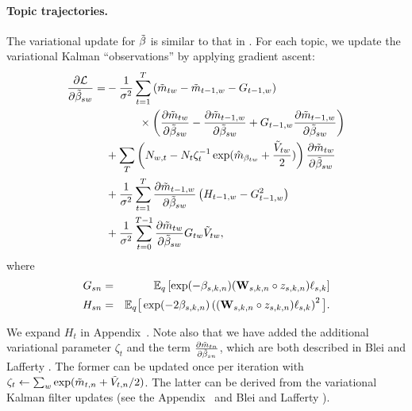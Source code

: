 \paragraph{Topic trajectories.}
The variational update for $\tilde{\beta}$ is similar to that in
\cite{blei:2006}. For each topic, we update the variational Kalman   %
``observations'' by applying gradient ascent:
\begin{align*}
\frac{\partial \mathcal{L}}{\partial \tilde{\beta}_{sw}} =
   & -  \frac{1}{\sigma^2} \sum_{t=1}^T
     \left( \tilde{m}_{tw} - \tilde{m}_{t-1,w} - G_{t-1,w} \right) \\
   & \hspace{30pt}  \times \left( \frac{\partial \tilde{m}_{tw}}{\partial \tilde{\beta}_{sw}}
     - \frac{\partial \tilde{m}_{t-1,w}}{\partial \tilde{\beta}_{sw}}
     + G_{t-1,w} \frac{\partial \tilde{m}_{t-1,w}}{\partial \tilde{\beta}_{sw}} \right) \\
   & +  \sum_T \left(
       N_{w,t} - N_{t} \zeta_t^{-1}
       \exp( \hat{m}_{\beta_{tw}} + \frac{\tilde{V}_{tw}}{2} ) \right)
       \frac{\partial \tilde{m}_{tw}}{\partial \tilde{\beta}_{sw}} \\
   & +  \frac{1}{\sigma^2} \sum_{t=1}^T
         \frac{\partial \tilde{m}_{t-1,w}}{\partial \tilde{\beta}_{sw}}
         \left( H_{t-1,w} - G_{t-1,w}^2 \right) \\
   & +  \frac{1}{\sigma^2} \sum_{t=0}^{T-1}
         \frac{\partial \tilde{m}_{tw}}{\partial \tilde{\beta}_{sw}}
         G_{tw} \tilde{V}_{tw},
\end{align*}
where
\begin{eqnarray*}
 G_{sn} &=& \mathbb{E}_q\left[\exp(-\beta_{s,k,n} ) ( \textbf{W}_{s,k,n} \circ
  z_{s,k,n} ) \ell_{s,k}\right] \\
 H_{sn} &=& \mathbb{E}_q \big[ \exp(-2 \beta_{s,k,n}) \left( (\textbf{W}_{s,k,n} \circ z_{s,k,n} ) \ell_{s,k} \right)^2 \big].
\end{eqnarray*}

We expand $H_t$ in Appendix~. Note also
that we have added the additional variational parameter $\zeta_t$ and
the term $\frac{\partial \tilde{m}_{tn}}{\partial \tilde{\beta}_{sn}}$, which are both described in
Blei and Lafferty \cite{blei:2006}. The %
former can be updated once per iteration with $\zeta_t \gets \sum_w
\exp(\tilde{m}_{t,n} + \tilde{V}_{t,n}/2)$. The latter can be derived from the
variational Kalman filter updates (see the Appendix~ and
Blei and Lafferty \cite{blei:2006}).

